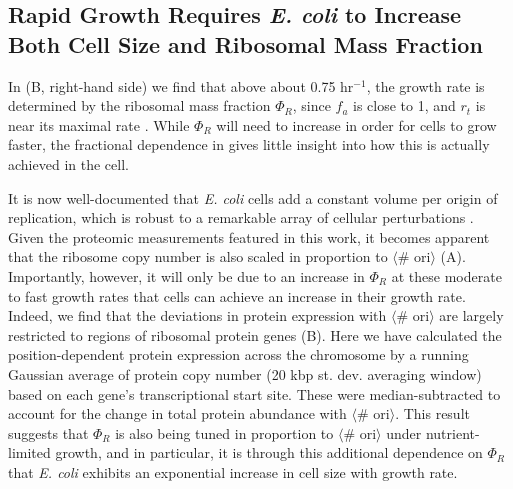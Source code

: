 \subsection{Rapid Growth Requires \textit{E. coli} to Increase Both Cell Size and Ribosomal
Mass Fraction}
In (B, right-hand side) we find that above about 0.75
hr$^{-1}$, the growth rate is determined by the ribosomal mass fraction
$\Phi_R$, since $f_a$ is close to 1, and $r_t$ is near its maximal rate
\citep{dai2016}. While $\Phi_R$ will need to increase in order for cells to
grow faster, the fractional dependence in 
gives little insight into how this is actually achieved in the cell.

It is now well-documented that \textit{E. coli} cells add a constant volume per
origin of replication, which is robust to a remarkable array of cellular
perturbations \citep{si2017}. Given the proteomic measurements featured in this
work, it becomes apparent that the ribosome copy number is also scaled in proportion to $\langle$\# ori$\rangle$
(A). Importantly, however, it will only be due to
an increase in $\Phi_R$ at these moderate to fast growth rates that cells can
achieve an increase in their growth rate. Indeed, we find that the deviations in
protein expression with $\langle$\# ori$\rangle$ are largely restricted to
regions of ribosomal protein genes (B). Here we
have calculated the position-dependent protein expression across the chromosome
by a running Gaussian average of protein copy number (20 kbp st. dev. averaging
window) based on each gene's transcriptional start site. These were
median-subtracted to account for the change in total protein abundance with
$\langle$\# ori$\rangle$. This result suggests that $\Phi_R$ is also being tuned
in proportion to $\langle$\# ori$\rangle$ under nutrient-limited growth, and in
particular, it is through this additional dependence on $\Phi_R$ that \textit{E.
coli} exhibits an exponential increase in cell size with growth rate.





